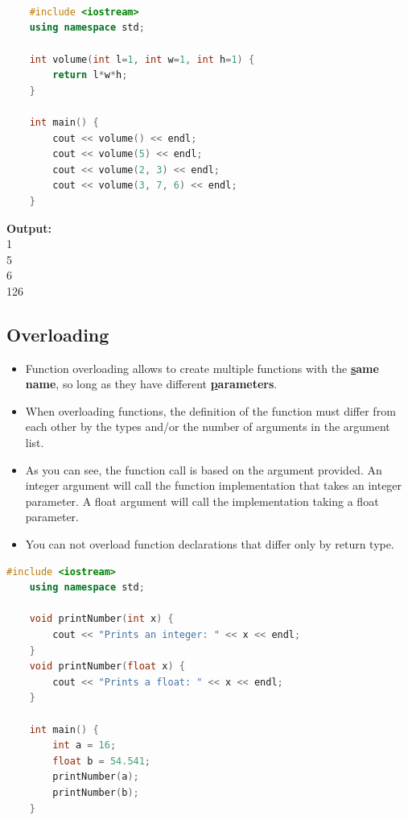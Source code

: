 \documentclass[12pt , a4paper]{article}
\begin{document}
	\begin{lstlisting}[language=C++]



	#include <iostream>
	using namespace std;
	
	int volume(int l=1, int w=1, int h=1) {
	    return l*w*h;
	}
	
	int main() {
	    cout << volume() << endl;
	    cout << volume(5) << endl;
	    cout << volume(2, 3) << endl;
	    cout << volume(3, 7, 6) << endl;
	}
	\end{lstlisting}

	\begin{tcolorbox}
	\textbf{Output:}\\
	1\\
	5\\
	6\\
	126
	\end{tcolorbox}


	\subsection{Overloading}
	\begin{itemize}
		\item Function overloading allows to create multiple functions with the \textbf{\underline same name}, so long as they have different \textbf{ \underline parameters}.\\
		\item When overloading functions, the definition of the function must differ from each other by the types and/or the number of arguments in the argument list.\\
		\item As you can see, the function call is based on the argument provided. An integer argument will call the function implementation that takes an integer parameter. A float argument will call the implementation taking a float parameter.\\
		\item You can not overload function declarations that differ only by return type.\\
	\end{itemize}

	\begin{lstlisting}[language=C++]
	#include <iostream>
	using namespace std;
	
	void printNumber(int x) {
	    cout << "Prints an integer: " << x << endl;
	}
	void printNumber(float x) {
	    cout << "Prints a float: " << x << endl;
	}
	
	int main() {
	    int a = 16;
	    float b = 54.541;
	    printNumber(a);
	    printNumber(b);
	}

	\end{lstlisting}
\end{document}
